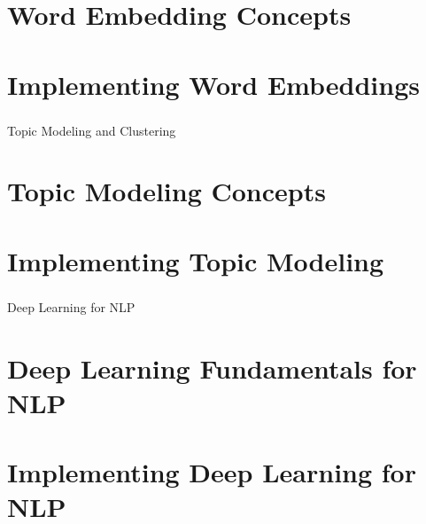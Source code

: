 \section[Day 6 Theory]{Word Embedding Concepts}




\section[Day 6 Lab]{Implementing Word Embeddings}




\begin{frame}[fragile]\frametitle{}
\begin{center}
{\Large Topic Modeling and Clustering}
\end{center}
\end{frame}

\section[Day 7 Theory]{Topic Modeling Concepts}




\section[Day 7 Lab]{Implementing Topic Modeling}



\begin{frame}[fragile]\frametitle{}
\begin{center}
{\Large Deep Learning for NLP}
\end{center}
\end{frame}

\section[Day 8 Theory]{Deep Learning Fundamentals for NLP}




\section[Day 8 Lab]{Implementing Deep Learning for NLP}




